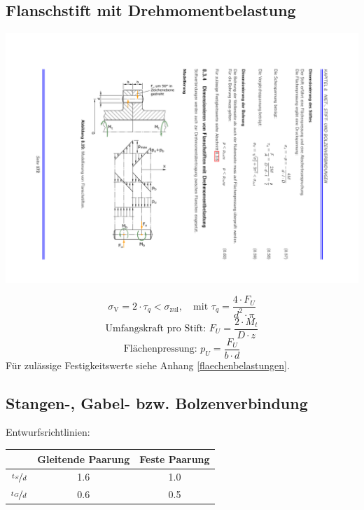 	\subsection{Flanschstift mit Drehmomentbelastung} %
		\begin{center}
			\includegraphics[width=.75\columnwidth]{graphics/flanschstift_drehmom}
		\end{center}
		\begin{equation*}
			\sigma_{\text{V}} = 2 \cdot \tau_q < \sigma_{\text{zul}}, \quad \text{mit } \tau_q = \frac{4 \cdot F_U}{d^2 \cdot \pi}
		\end{equation*}
		\begin{equation*}
			\text{Umfangskraft pro Stift: } F_U = \frac{2 \cdot M_t}{D \cdot z}
		\end{equation*}
		\begin{equation*}
			\text{Flächenpressung: } p_U = \frac{F_U}{b \cdot d}
		\end{equation*}
		Für zulässige Festigkeitswerte siehe Anhang \ref{flaechenbelastungen}.
	\subsection{Stangen-, Gabel- bzw. Bolzenverbindung} %
		Entwurfsrichtlinien:
		\begin{center}
			\begin{tabular}{ccc}
				\toprule
				& \textbf{Gleitende Paarung} & \textbf{Feste Paarung} \\
				\midrule
				$\displaystyle\nicefrac{t_S}{d}$ & 1.6 & 1.0 \\
				$\displaystyle\nicefrac{t_G}{d}$ & 0.6 & 0.5 \\
				\bottomrule
			\end{tabular}
		\end{center}

